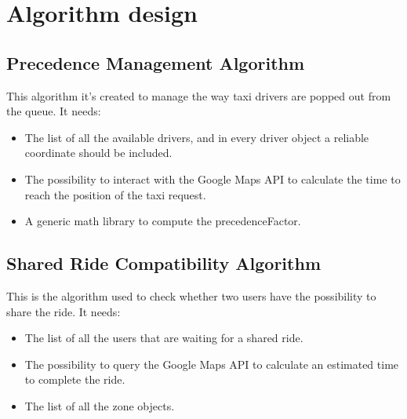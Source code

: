 

\section{Algorithm design} %
\label{sec:algorithm_design}


\subsection{Precedence Management Algorithm} %
\label{sub:first_algorithm}
This algorithm it's created to manage the way taxi drivers are popped out from the queue.
It needs:

\begin{itemize}
	\item The list of all the available drivers, and in every driver object a reliable coordinate should be included.
	\item The possibility to interact with the Google Maps API to calculate the time to reach the position of the taxi request.
	\item A generic math library to compute the precedenceFactor.
\end{itemize}







\subsection{Shared Ride Compatibility Algorithm} %
\label{sub:second_algorithm}
This is the algorithm used to check whether two users have the possibility to share the ride.
It needs:
\begin{itemize}
	\item The list of all the users that are waiting for a shared ride.
	\item The possibility to query the Google Maps API to calculate an estimated time to complete the ride.
	\item The list of all the zone objects.
\end{itemize}


